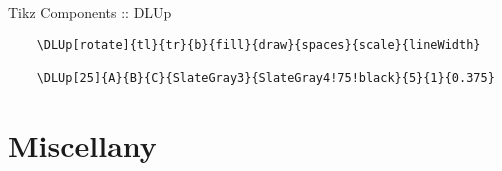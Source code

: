 \documentclass[9pt,svgnames,x11names]{beamer}
\begin{document}

\begin{frame}[fragile]{Tikz Components :: DLUp}

    \footnotesize
    \begin{verbatim}
    \DLUp[rotate]{tl}{tr}{b}{fill}{draw}{spaces}{scale}{lineWidth}

    \DLUp[25]{A}{B}{C}{SlateGray3}{SlateGray4!75!black}{5}{1}{0.375}
  \end{verbatim}
    \centering

\end{frame}

\section{Miscellany}

%     
\end{document}
